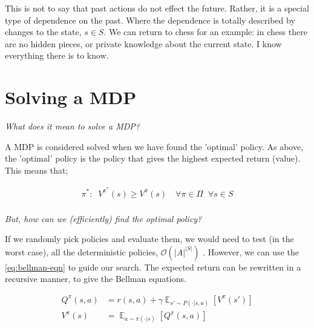 
This is not to say that past actions do not effect the future. Rather,
it is a special type of dependence on the past. Where the dependence is
totally described by changes to the state, $s\in S$. We can return to chess for
an example: in chess there are no hidden pieces, or
private knowledge about the current state. I know everything there is to know.


\section{Solving a MDP}

\begin{displayquote}
  \textsl{What does it mean to solve a MDP?}
\end{displayquote}

A MDP is considered solved when we have found the 'optimal' policy. As above,
the 'optimal' policy is the policy that gives the highest expected return (value).
This means that;

\begin{align*}
\pi^{*} : \;\; V^{\pi^* }(s) \ge V^{\pi}(s) \quad \forall \pi\in \Pi \;\;\forall s\in S\\
\end{align*}


\begin{displayquote}
  \textsl{But, how can we (efficiently) find the optimal policy?}
\end{displayquote}

If we randomly pick policies and evaluate them, we would need to test (in the worst case),
all the deterministic policies, $\mathcal O(|A|^{|S|})$ . However, we can use the \ref{eq:bellman-eqn} to
guide our search. The expected return can be rewritten in a recursive manner, to give the Bellman equations.

\begin{align*}
Q^{\pi}(s, a) &= r(s, a) + \gamma \mathop{\mathbb E}_{s' \sim P(\cdot|s, a)} [V^{\pi}(s')] \label{eq:bellman-eqn}\tag{Bellman equation}\\
V^{\pi}(s) &= \mathop{\mathbb E}_{a \sim \pi(\cdot|s)} [Q^{\pi}(s, a)]
\end{align*}

